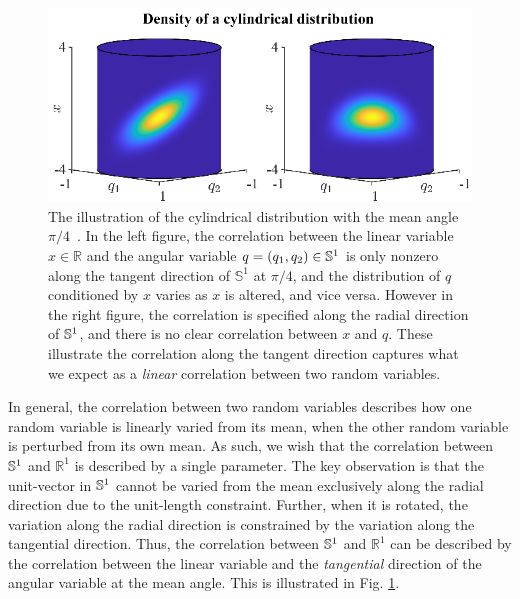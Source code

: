 \begin{figure}
	\centering
	\includegraphics[scale=1.4]{figures/MFG-angular-linear-correlation}
	\caption[The illustration of the cylindrical distribution with the mean angle $\pi/4$~\cite{mardia1978model}.]{The illustration of the cylindrical distribution with the mean angle $\pi/4$~\cite{mardia1978model}.
		In the left figure, the correlation between the linear variable $x\in\mathbb{R}$ and the angular variable $q=(q_1,q_2)\in\mathbb{S}^1$ is only nonzero along the tangent direction of $\mathbb{S}^1$ at $\pi/4$, and the distribution of $q$ conditioned by $x$ varies as $x$ is altered, and vice versa. 
		However in the right figure,  the correlation is specified along the radial direction of $\mathbb{S}^1$, and there is no clear correlation between $x$ and $q$.
		These illustrate the correlation along the tangent direction captures what we expect as a \textit{linear} correlation between two random variables.
		\label{fig:MFG-angular-linear-correlation}}
\end{figure}

In general, the correlation between two random variables describes how one random variable is linearly varied from its mean, when the other random variable is perturbed from its own mean. 
As such, we wish that the correlation between $\mathbb{S}^1$ and $\mathbb{R}^1$ is described by a single parameter. 
The key observation is that the unit-vector in $\mathbb{S}^1$ cannot be varied from the mean exclusively along the radial direction due to the unit-length constraint. 
Further, when it is rotated, the variation along the radial direction is constrained by the variation along the tangential direction. 
Thus, the correlation between $\mathbb{S}^1$ and $\mathbb{R}^1$ can be described by the correlation between the linear variable and the \textit{tangential} direction of the angular variable at the mean angle.
This is illustrated in Fig. \ref{fig:MFG-angular-linear-correlation}.

